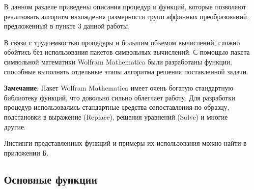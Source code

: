 \documentclass[../main.tex]{subfiles}
\begin{document}
В данном разделе приведены описания процедур и функций, которые позволяют реализовать алгоритм нахождения размерности групп аффинных преобразований, предложенный в пункте 3 данной работы. 

В связи с трудоемкостью процедуры и большим объемом вычислений, сложно обойтись без использования пакетов символьных вычислений. С помощью пакета символьной математики {\ttfamily Wolfram Mathematica} были разработаны функции, способные выполнять отдельные этапы алгоритма решения поставленной задачи.

\textbf{Замечание}: Пакет {\ttfamily Wolfram Mathematica} имеет очень богатую стандартную библиотеку функций, что довольно сильно облегчает работу. Для разработки процедур использовались стандартные средства сопоставления по образцу, подстановки в выражение ({\ttfamily Replace}), решения уравнений ({\ttfamily Solve}) и многие другие.

Листинги представленных функций и примеры их использования можно найти в приложении Б.

\subsection{Основные функции}
\end{document}
